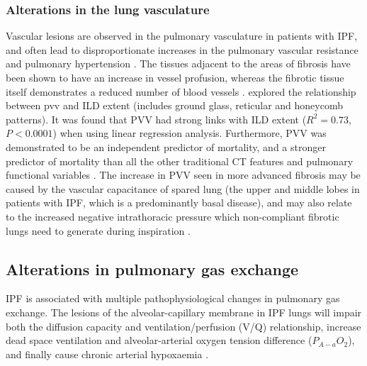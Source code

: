 \subsubsection{Alterations in the lung vasculature} \label{VasculatureAlterations}
Vascular lesions are observed in the pulmonary vasculature in patients with IPF, and often lead to disproportionate increases in the pulmonary vascular resistance and pulmonary hypertension \citep{plantier2018physiology}. The tissues adjacent to the areas of fibrosis have been shown to have an increase in vessel profusion, whereas the fibrotic tissue itself demonstrates a reduced number of blood vessels \citep{cosgrove2004pigment,ebina2004heterogeneous}. \cite{Jacob2016Evaluation} explored the relationship between \gls{pvv} and ILD extent (includes ground glass, reticular and honeycomb patterns). It was found that PVV had strong links with ILD extent ($R^2 = 0.73$, $P < 0.0001$) when using linear regression analysis. Furthermore, PVV was demonstrated to be an independent predictor of mortality, and a stronger predictor of mortality than all the other traditional CT features and pulmonary functional variables \citep{Jacob2016Evaluation}. The increase in PVV seen in more advanced fibrosis may be caused by the vascular capacitance of spared lung (the upper and middle lobes in patients with IPF, which is a predominantly basal disease), and may also relate to the increased negative intrathoracic pressure which non-compliant fibrotic lungs need to generate during inspiration \citep{Jacob2016Mortality}.

\subsection{Alterations in pulmonary gas exchange}
IPF is associated with multiple pathophysiological changes in pulmonary gas exchange. The lesions of the alveolar-capillary membrane in IPF lungs will impair both the diffusion capacity and ventilation/perfusion (V/Q) relationship, increase dead space ventilation and alveolar-arterial oxygen tension difference ($P_{A-a}O_2$), and finally cause chronic arterial hypoxaemia \citep{crystal1976idiopathic,plantier2018physiology,american2000idiopathic}.

